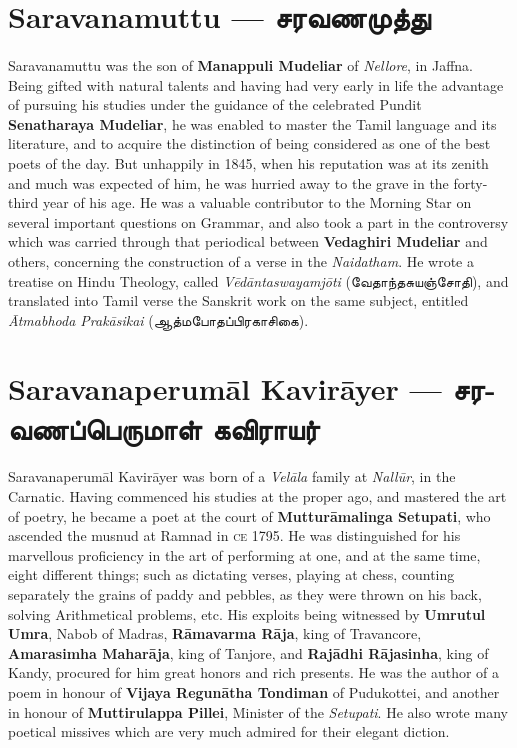 \documentclass{article}
\newcommand{\TamilText}[1]{\texttamil{#1}}
\newcommand{\TamilBold}[1]{\texttamil{\textbf{#1}}}
\newcommand{\tam}[1]{\TamilText{#1}}
\newcommand{\tambold}[1]{\TamilBold{#1}}
\begin{document}
\section{Saravanamuttu --- \tambold{சரவணமுத்து}}
\paragraph{}
Saravanamuttu was the son of \textbf{Manappuli Mudeliar} of \emph{Nellore}, in Jaffna. Being gifted with natural talents and having had very early in life the advantage of pursuing his studies under the guidance of the celebrated Pundit \textbf{Senatharaya Mudeliar}, he was enabled to master the Tamil language and its literature, and to acquire the distinction of being considered as one of the best poets of the day. But unhappily in 1845, when his reputation was at its zenith and much was expected of him, he was hurried away to the grave in the forty-third year of his age. He was a valuable contributor to the Morning Star on several important questions on Grammar, and also took a part in the controversy which was carried through that periodical between \textbf{Vedaghiri Mudeliar} and others, concerning the construction of a verse in the \emph{Naidatham}. He wrote a treatise on Hindu Theology, called \emph{V\={e}d\={a}ntaswayamj\={o}ti} (\tam{வேதாந்தசுயஞ்சோதி}), and translated into Tamil verse the Sanskrit work on the same subject, entitled \emph{\={A}tmabhoda Prak\={a}sikai} (\tam{ஆத்மபோதப்பிரகாசிகை}).

\section{Saravanaperum\={a}l Kavir\={a}yer --- \tambold{சரவணப்பெருமாள் கவிராயர்}}
\paragraph{}
Saravanaperum\={a}l Kavir\={a}yer was born of a \emph{Vel\={a}la} family at \emph{Nall\={u}r}, in the Carnatic. Having commenced his studies at the proper ago, and mastered the art of poetry, he became a poet at the court of \textbf{Muttur\={a}malinga Setupati}, who ascended the musnud at Ramnad in \textsc{ce} 1795. He was distinguished for his marvellous proficiency in the art of performing at one, and at the same time, eight different things; such as dictating verses, playing at chess, counting separately the grains of paddy and pebbles, as they were thrown on his back, solving Arithmetical problems, etc. His exploits being witnessed by \textbf{Umrutul Umra}, Nabob of Madras, \textbf{R\={a}mavarma R\={a}ja}, king of Travancore, \textbf{Amarasimha Mahar\={a}ja}, king of Tanjore, and \textbf{Raj\={a}dhi R\={a}jasinha}, king of Kandy, procured for him great honors and rich presents. He was the author of a poem in honour of \textbf{Vijaya Regun\={a}tha Tondiman} of Pudukottei, and another in honour of \textbf{Muttirulappa Pillei}, Minister of the \emph{Setupati}. He also wrote many poetical missives which are very much admired for their elegant diction.
\end{document}
